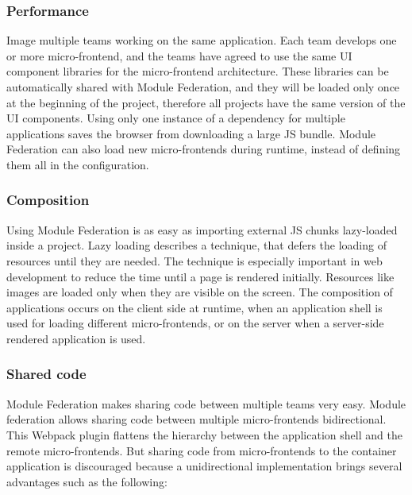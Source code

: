 \subsubsection{Performance}\label{subsubsection:background:micro-frontend:module-federation:performance}

Image multiple teams working on the same application. Each team develops one or more micro-frontend, and the teams have agreed to use the same \ac{UI} component libraries for the micro-frontend architecture. These libraries can be automatically shared with Module Federation, and they will be loaded only once at the beginning of the project, therefore all projects have the same version of the \ac{UI} components. Using only one instance of a dependency for multiple applications saves the browser from downloading a large \ac{JS} bundle. Module Federation can also load new micro-frontends during runtime, instead of defining them all in the configuration. \cite[83]{book:2021:mezzalira:applied-methods:building-micro-frontends}

\subsubsection{Composition}\label{subsubsection:background:micro-frontend:module-federation:composition}

Using Module Federation is as easy as importing external \ac{JS} chunks lazy-loaded inside a project. Lazy loading describes a technique, that defers the loading of resources until they are needed. The technique is especially important in web development to reduce the time until a page is rendered initially. Resources like images are loaded only when they are visible on the screen. The composition of applications occurs on the client side at runtime, when an application shell is used for loading different micro-frontends, or on the server when a server-side rendered application is used. \cite[84]{book:2021:mezzalira:applied-methods:building-micro-frontends}

\subsubsection{Shared code}\label{subsubsection:background:micro-frontend:module-federation:shared-code}

Module Federation makes sharing code between multiple teams very easy. Module federation allows sharing code between multiple micro-frontends bidirectional. This Webpack plugin flattens the hierarchy between the application shell and the remote micro-frontends. But sharing code from micro-frontends to the container application is discouraged because a unidirectional implementation brings several advantages such as the following: \cite[84]{book:2021:mezzalira:applied-methods:building-micro-frontends}


